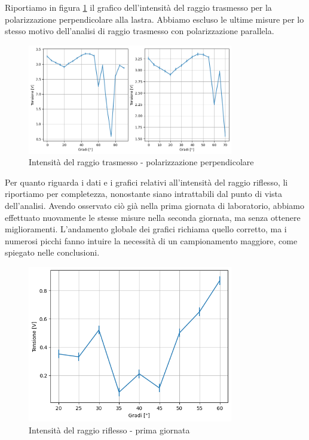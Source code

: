 \documentclass[letterpaper,12pt]{article}
\begin{document}
Riportiamo in figura \ref{fig:wrong_pol} il grafico dell'intensità del raggio trasmesso per la polarizzazione
perpendicolare alla lastra. Abbiamo escluso le ultime misure per lo stesso motivo dell'analisi di raggio trasmesso
con polarizzazione parallela.\\

\begin{figure}[h!]
    \centering
    \includegraphics[width = 0.8\textwidth]{wrong_pol.png}
    \caption{Intensità del raggio trasmesso - polarizzazione perpendicolare}
    \label{fig:wrong_pol}
\end{figure}

Per quanto riguarda i dati e i grafici relativi all'intensità del raggio riflesso, li riportiamo per completezza, 
nonostante siano intrattabili dal punto di vista dell'analisi. Avendo osservato ciò già nella prima giornata di
laboratorio, abbiamo effettuato nuovamente le stesse misure nella seconda giornata, ma senza ottenere miglioramenti.
L'andamento globale dei grafici richiama quello corretto, ma i numerosi picchi fanno intuire la necessità di un
campionamento maggiore, come spiegato nelle conclusioni.\\

\begin{figure}[h!]
    \centering
    \includegraphics[width = 0.8\textwidth]{riflesso1.png}
    \caption{Intensità del raggio riflesso - prima giornata}
    \label{fig:riflesso1}
\end{figure}
\end{document}
